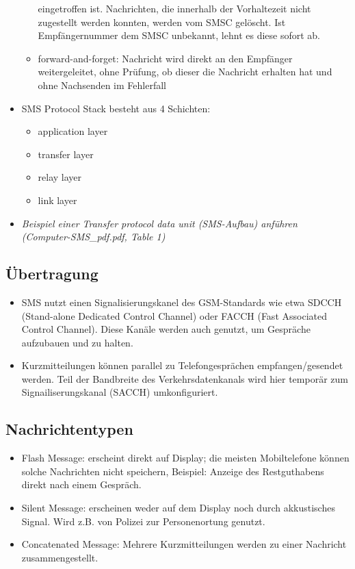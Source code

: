 \documentclass[german,12pt,a4paper]{article}
\begin{document}
\begin{itemize}
\begin{itemize}
				eingetroffen ist. Nachrichten, die innerhalb der Vorhaltezeit nicht zugestellt werden 
				konnten, werden vom SMSC gelöscht. Ist Empfängernummer dem SMSC unbekannt, lehnt es diese sofort ab.
			\item forward-and-forget: Nachricht wird direkt an den Empfänger weitergeleitet, ohne Prüfung, ob 
				dieser die Nachricht erhalten hat und ohne Nachsenden im Fehlerfall
		\end{itemize}	
	\item SMS Protocol Stack besteht aus 4 Schichten:
		\begin{itemize}
			\item application layer
			\item transfer layer
			\item relay layer
			\item link layer
		\end{itemize}		
	\item \textit{Beispiel einer Transfer protocol data unit (SMS-Aufbau) anführen \\(Computer-SMS\_pdf.pdf, Table 1)}
\end{itemize}

\subsection{Übertragung}
\begin{itemize}
	\item SMS nutzt einen Signalisierungskanel des GSM-Standards wie etwa SDCCH (Stand-alone Dedicated Control Channel) 
		oder FACCH (Fast Associated Control Channel). Diese Kanäle werden auch genutzt, um Gespräche aufzubauen und zu 
		halten.
	\item Kurzmitteilungen können parallel zu Telefongesprächen empfangen/gesendet werden. Teil der Bandbreite des 
		Verkehrsdatenkanals wird hier temporär zum Signailiserungskanal (SACCH) umkonfiguriert.
\end{itemize}

\subsection{Nachrichtentypen}
\begin{itemize}
	\item Flash Message: erscheint direkt auf Display; die meisten Mobiltelefone können solche Nachrichten nicht speichern,
		Beispiel: Anzeige des Restguthabens direkt nach einem Gespräch.
	\item Silent Message: erscheinen weder auf dem Display noch durch akkustisches Signal. 
		Wird z.B. von Polizei zur Personenortung genutzt.
	\item Concatenated Message: Mehrere Kurzmitteilungen werden zu einer Nachricht zusammengestellt.
\end{itemize}
\end{document}
